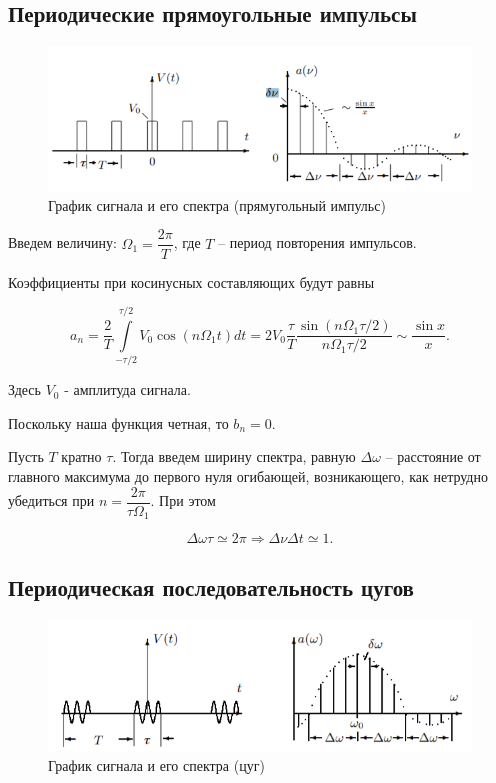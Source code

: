 \subsection{Периодические прямоугольные импульсы}

\begin{figure}[h!]
    \centering
    \includegraphics[width = 12 cm]{images/theor_1.png}
    \caption{График сигнала и его спектра (прямугольный импульс)}
    \label{theor_1}
\end{figure}

Введем величину: $\Omega_1 = \dfrac{2\pi}{T}$,
где $T$ -- период повторения импульсов.

Коэффициенты при косинусных составляющих будут равны

\begin{equation}
    a_n = \dfrac{2}{T} \int \limits_{-\tau/2}^{\tau/2} V_0 \cos \left( n \Omega_1 t \right) dt = 2V_0\dfrac{\tau}{T}\dfrac{\sin\left(n\Omega_1\tau/2\right)}{n\Omega_1\tau/2} \sim \dfrac{\sin x}{x}.
\end{equation}

Здесь $V_0$ - амплитуда сигнала.

Поскольку наша функция четная, то $b_n = 0$. 

Пусть $T$ кратно $\tau$. Тогда введем ширину спектра, равную $\Delta \omega$ -- расстояние от главного максимума до первого нуля огибающей, возникающего, как нетрудно убедиться при $n = \dfrac{2\pi}{\tau \Omega_1}$. При этом

\begin{equation}
    \Delta \omega \tau \simeq 2\pi \Rightarrow \Delta \nu \Delta t \simeq 1.
\end{equation}

\subsection{Периодическая последовательность цугов}

\begin{figure}[h!]
    \centering
    \includegraphics[width = 12 cm]{images/theor_2.png}
    \caption{График сигнала и его спектра (цуг)}
    \label{theor_2}
\end{figure}

